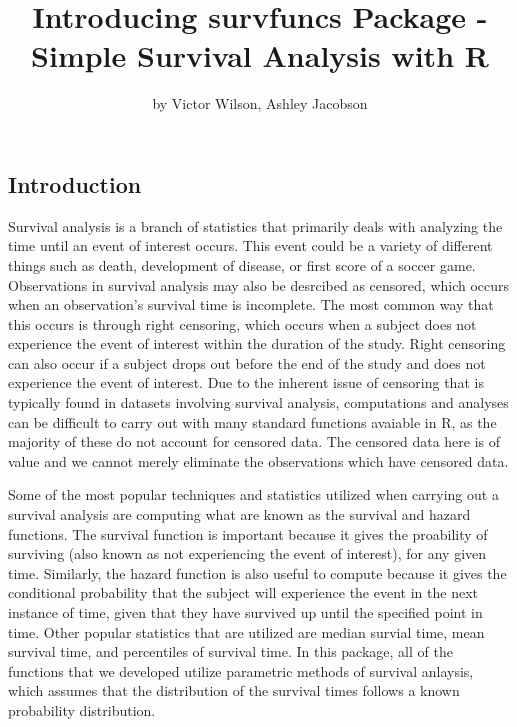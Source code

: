 \title{Introducing survfuncs Package - Simple Survival Analysis with R}
\author{by Victor Wilson, Ashley Jacobson}

\maketitle



\hypertarget{introduction}{%
\subsection{Introduction}\label{introduction}}

Survival analysis is a branch of statistics that primarily deals with
analyzing the time until an event of interest occurs. This event could
be a variety of different things such as death, development of disease,
or first score of a soccer game. Observations in survival analysis may
also be desrcibed as censored, which occurs when an observation's
survival time is incomplete. The most common way that this occurs is
through right censoring, which occurs when a subject does not experience
the event of interest within the duration of the study. Right censoring
can also occur if a subject drops out before the end of the study and
does not experience the event of interest. Due to the inherent issue of
censoring that is typically found in datasets involving survival
analysis, computations and analyses can be difficult to carry out with
many standard functions avaiable in R, as the majority of these do not
account for censored data. The censored data here is of value and we
cannot merely eliminate the observations which have censored data.

Some of the most popular techniques and statistics utilized when
carrying out a survival analysis are computing what are known as the
survival and hazard functions. The survival function is important
because it gives the proability of surviving (also known as not
experiencing the event of interest), for any given time. Similarly, the
hazard function is also useful to compute because it gives the
conditional probability that the subject will experience the event in
the next instance of time, given that they have survived up until the
specified point in time. Other popular statistics that are utilized are
median survial time, mean survival time, and percentiles of survival
time. In this package, all of the functions that we developed utilize
parametric methods of survival anlaysis, which assumes that the
distribution of the survival times follows a known probability
distribution.

